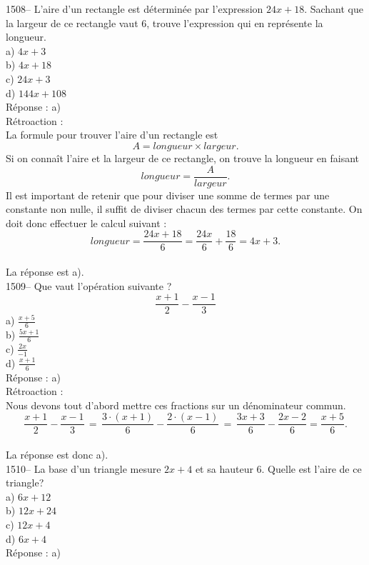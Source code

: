 1508-- L'aire d'un rectangle est d\'etermin\'ee par l'expression
$24x+18$. Sachant que la largeur de ce rectangle vaut 6, trouve
l'expression qui en repr\'esente la longueur.\\
a) $4x+3$\\
b) $4x+18$\\
c) $24x+3$\\
d) $144x+108$\\

R\'eponse : a)\\

R\'etroaction :\\
La formule pour trouver l'aire d'un rectangle est $$A=longueur\times
largeur.$$ Si on conna\^it l'aire et la largeur de ce rectangle, on
trouve la longueur en faisant
$$longueur=\frac{A}{largeur}.$$ Il
est important de retenir que pour diviser une somme de termes par
une constante non nulle, il suffit de diviser chacun des termes par
cette constante. On doit donc effectuer le calcul suivant
:$$longueur=\frac{24x+18}{6}=\frac{24x}{6}+\frac{18}{6}=4x+3.$$\\  La
r\'eponse est a).\\

1509-- Que vaut l'op\'eration suivante ?
$$\frac{x+1}{2}-\frac{x-1}{3}$$
a) {\Large$\frac{x+5}{6} $}\\[3mm]
b) {\Large$\frac{5x+1}{6} $}\\[3mm]
c) {\Large$\frac{2x}{-1}$}\\[3mm]
d) {\Large$\frac{x+1}{6} $}\\[3mm]

R\'eponse : a)\\

R\'etroaction :\\
Nous devons tout d'abord mettre ces fractions sur un d\'enominateur
commun.
$$\frac{x+1}{2}-\frac{x-1}{3}\,=\,\frac{3\cdot(x+1)}{6}-\frac{2\cdot(x-1)}{6}\,=\,\frac{3x+3}{6}-\frac{2x-2}{6}=\frac{x+5}{6}.$$\\
La r\'eponse est donc a).\\

1510-- La base d'un triangle mesure $2x+4$ et sa hauteur $6$. Quelle
est
l'aire de ce triangle?\\
a) $6x+12$\\
b) $12x+24$\\
c) $12x+4$\\
d) $6x+4$\\

R\'eponse : a)\\

